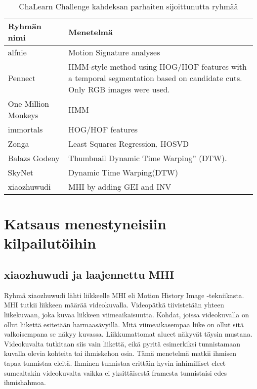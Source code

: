 \begin{table}[th]
\caption{ChaLearn Challenge kahdeksan parhaiten sijoittunutta ryhmää}
\label{table:dvbt_param}
\begin{center}
\begin{tabular}{|p{}|p{}|} 
    \hline
Ryhmän nimi & Menetelmä \\
    \hline
    \hline
alfnie & Motion Signature analyses\\ 
    \hline
Pennect & HMM-style method using HOG/HOF features
with a temporal segmentation based on candidate cuts.
Only RGB images were used.\\
    \hline
One Million Monkeys & HMM\\
    \hline
immortals & HOG/HOF features\\
    \hline
Zonga & Least Squares Regression, HOSVD\\
    \hline
Balazs Godeny & Thumbnail Dynamic Time Warping” (DTW).\\
    \hline
SkyNet & Dynamic Time Warping(DTW)\\
    \hline
xiaozhuwudi & MHI by adding GEI and INV\\
    \hline	
\end{tabular}
\end{center}
\end{table}

\newpage

\section {Katsaus menestyneisiin kilpailutöihin}

\subsection{xiaozhuwudi ja laajennettu MHI}
Ryhmä xiaozhuwudi lähti liikkeelle MHI eli Motion History Image -tekniikasta. \citep {6239179} MHI tutkii liikkeen määrää videokuvalla.
Videopätkä tiivistetään yhteen liikekuvaan, joka kuvaa liikkeen viimeaikaisuutta. Kohdat, joissa videokuvalla on ollut
liikettä esitetään harmaasävyillä. Mitä viimeaikasempaa liike on ollut sitä valkoisempana se näkyy kuvassa. Liikkumattomat
alueet näkyvät täysin mustana. Videokuvalta tutkitaan siis vain liikettä, eikä pyritä esimerkiksi tunnistamaan kuvalla olevia kohteita
tai ihmiskehon osia. Tämä menetelmä matkii ihmisen tapaa tunnistaa eleitä. Ihminen tunnistaa erittäin hyvin inhimilliset eleet  
sumealtakin videokuvalta vaikka ei yksittäisestä framesta tunnistaisi edes ihmishahmoa. \citep {910878}  \\


